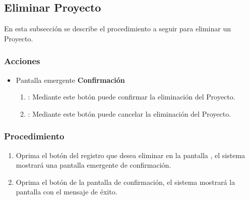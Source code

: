 \subsection{Eliminar Proyecto}

En esta subsección se describe el procedimiento a seguir para eliminar un Proyecto.


\subsubsection{Acciones}
\begin{itemize}
  \item Pantalla emergente \textbf{Confirmación}
  \begin{enumerate}
	\item {}: Mediante este botón puede confirmar la eliminación del Proyecto.
	\item {}: Mediante este botón puede cancelar la eliminación del Proyecto.
  \end{enumerate}
\end{itemize}


\subsubsection{Procedimiento}
\begin{enumerate}
	\item Oprima el botón \btnEliminar del registro que desea eliminar en la pantalla , el sistema mostrará una pantalla emergente de confirmación.
	
	\item Oprima el botón  de la pantalla de confirmación, el sistema mostrará la pantalla  con el mensaje de éxito.
\end{enumerate}

